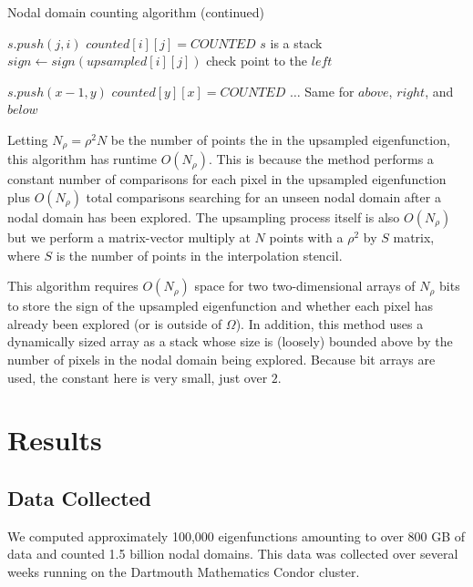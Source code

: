 \documentclass{report}
\begin{document}
\clearpage
\begin{algorithm}
  \ContinuedFloat
  \caption{Nodal domain counting algorithm (continued)}
  \begin{algorithmic}

        \State $s.push(j,i)$
        \State $counted[i][j] = COUNTED$
        \Comment $s$ is a stack
        \State $sign \gets sign(upsampled[i][j])$
             \Comment check point to the $left$

                \State $s.push(x-1,y)$
                \State $counted[y][x] = COUNTED$
            \EndIf
            \State $\ldots$ \Comment Same for $above$, $right$, and $below$
        \EndWhile
    \EndFunction

  \end{algorithmic}
\end{algorithm}

Letting $N_\rho = \rho^{2} N$ be the number of points the in the upsampled eigenfunction, this algorithm has runtime $O(N_\rho)$. This is because the method performs a constant number of comparisons for each pixel in the upsampled eigenfunction plus $O(N_{\rho})$ total comparisons searching for an unseen nodal domain after a nodal domain has been explored. The upsampling process itself is also $O(N_{\rho})$ but we perform a matrix-vector multiply at $N$ points with a $\rho^{2}$ by $S$ matrix, where $S$ is the number of points in the interpolation stencil.

This algorithm requires $O(N_{\rho})$ space for two two-dimensional arrays of $N_\rho$ bits to store the sign of the upsampled eigenfunction and whether each pixel has already been explored (or is outside of $\Omega$). In addition, this method uses a dynamically sized array as a stack whose size is (loosely) bounded above by the number of pixels in the nodal domain being explored. Because bit arrays are used, the constant here is very small, just over $2$.

\chapter{Results}

\section{Data Collected}
We computed approximately 100,000 eigenfunctions amounting to over 800 GB of data and counted 1.5 billion nodal domains. This data was collected over several weeks running on the Dartmouth Mathematics Condor cluster.
\end{document}
